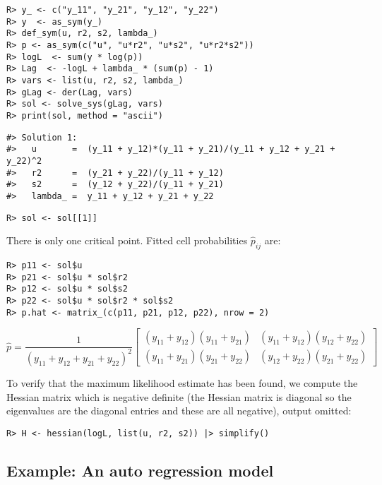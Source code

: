 \begin{verbatim}
R> y_ <- c("y_11", "y_21", "y_12", "y_22")
R> y  <- as_sym(y_)
R> def_sym(u, r2, s2, lambda_)
R> p <- as_sym(c("u", "u*r2", "u*s2", "u*r2*s2"))
R> logL  <- sum(y * log(p))
R> Lag  <- -logL + lambda_ * (sum(p) - 1) 
R> vars <- list(u, r2, s2, lambda_)
R> gLag <- der(Lag, vars)
R> sol <- solve_sys(gLag, vars)
R> print(sol, method = "ascii")
\end{verbatim}

\begin{verbatim}
#> Solution 1:
#>   u       =  (y_11 + y_12)*(y_11 + y_21)/(y_11 + y_12 + y_21 + y_22)^2 
#>   r2      =  (y_21 + y_22)/(y_11 + y_12) 
#>   s2      =  (y_12 + y_22)/(y_11 + y_21) 
#>   lambda_ =  y_11 + y_12 + y_21 + y_22
\end{verbatim}

\begin{verbatim}
R> sol <- sol[[1]]
\end{verbatim}

There is only one critical point. Fitted cell probabilities \(\hat p_{ij}\) are:

\begin{verbatim}
R> p11 <- sol$u
R> p21 <- sol$u * sol$r2
R> p12 <- sol$u * sol$s2
R> p22 <- sol$u * sol$r2 * sol$s2
R> p.hat <- matrix_(c(p11, p21, p12, p22), nrow = 2)
\end{verbatim}

\[
\hat p = \frac{1}{\left(y_{11} + y_{12} + y_{21} + y_{22}\right)^{2}}  \left[\begin{matrix}\left(y_{11} + y_{12}\right) \left(y_{11} + y_{21}\right) & \left(y_{11} + y_{12}\right) \left(y_{12} + y_{22}\right)\\\left(y_{11} + y_{21}\right) \left(y_{21} + y_{22}\right) & \left(y_{12} + y_{22}\right) \left(y_{21} + y_{22}\right)\end{matrix}\right]
\]

To verify that the maximum likelihood estimate has been found, we compute the Hessian matrix
which is negative definite (the Hessian matrix is diagonal so the eigenvalues are the diagonal entries and these are all negative), output omitted:

\begin{verbatim}
R> H <- hessian(logL, list(u, r2, s2)) |> simplify()
\end{verbatim}

\hypertarget{example-an-auto-regression-model}{%
\subsection{Example: An auto regression model}\label{example-an-auto-regression-model}}

